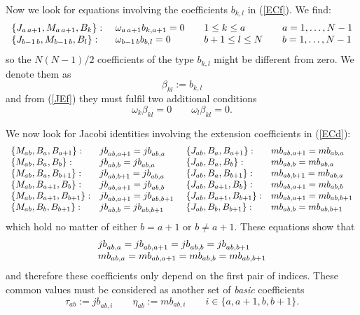 \documentclass[12pt]{article}
\begin{document}
Now we look for equations involving the  coefficients ${b}_{k,l}$
in (\ref{ECf}). We find:
\begin{equation}
\begin{array}{llll}
\{{J}_{a\, a+1},{M}_{a\, a+1},{B}_{k}\}:&\
{\omega}_{a\,a+1}{b}_{k,a+1}=0&\quad 1\le k\le a&\quad a=1,\dots,N-1\cr
\{{J}_{b-1\, b},{M}_{b-1\, b},{B}_{l}\}:&\
{\omega}_{b-1\,b}{b}_{b,l}=0&\quad b+1\le l\le N&\quad b=1,\dots,N-1
\end{array}
\label{JEf}
\end{equation}
so the $N(N-1)/2$ coefficients of the type ${b}_{k,l}$ might be
different from zero. We denote them as
\begin{equation}
{\beta}_{kl}:={b}_{k,l}
\label{cee}
\end{equation}
and from  (\ref{JEf}) they must fulfil two additional conditions
\begin{equation}
{\omega}_k {\beta}_{kl}=0\qquad {\omega}_l {\beta}_{kl}=0.
\label{cff}
\end{equation}

We now look for Jacobi identities involving the  extension
coefficients in (\ref{ECd}):
\begin{equation}
\begin{array}{llll}
\{{M}_{ab},{B}_{a},{B}_{a+1}\}:&{jb}_{ab,a+1}={jb}_{ab,a}&\
\{{J}_{ab},{B}_{a},{B}_{a+1}\}:&{mb}_{ab,a+1}={mb}_{ab,a}\cr
\{{M}_{ab},{B}_{a},{B}_{b}\}:&{jb}_{ab,b}={jb}_{ab,a}&\
\{{J}_{ab},{B}_{a},{B}_{b}\}:&{mb}_{ab,b}={mb}_{ab,a}\cr
\{{M}_{ab},{B}_{a},{B}_{b+1}\}:&{jb}_{ab,b+1}={jb}_{ab,a}&\
\{{J}_{ab},{B}_{a},{B}_{b+1}\}:&{mb}_{ab,b+1}={mb}_{ab,a}\cr
\{{M}_{ab},{B}_{a+1},{B}_{b}\}:&{jb}_{ab,a+1}={jb}_{ab,b}&\
\{{J}_{ab},{B}_{a+1},{B}_{b}\}:&{mb}_{ab,a+1}={mb}_{ab,b}\cr
\{{M}_{ab},{B}_{a+1},{B}_{b+1}\}:&{jb}_{ab,a+1}={jb}_{ab,b+1}&\
\{{J}_{ab},{B}_{a+1},{B}_{b+1}\}:&{mb}_{ab,a+1}={mb}_{ab,b+1}\cr
\{{M}_{ab},{B}_{b},{B}_{b+1}\}:&{jb}_{ab,b}={jb}_{ab,b+1}&\
\{{J}_{ab},{B}_{b},{B}_{b+1}\}:&{mb}_{ab,b}={mb}_{ab,b+1}
\end{array}
\label{cf}
\end{equation}
which hold no matter of either $b=a+1$ or $b\ne a+1$. These
equations show that
\begin{equation}
\begin{array}{l}
{jb}_{ab,a}={jb}_{ab,a+1}={jb}_{ab,b}={jb}_{ab,b+1}\cr
{mb}_{ab,a}={mb}_{ab,a+1}={mb}_{ab,b}={mb}_{ab,b+1}
\end{array}
\label{cg}
\end{equation}
and therefore these coefficients  only depend on the first pair of
indices. These common values must be considered as another set of
\emph{basic} coefficients
\begin{equation}
{\tau}_{ab}:={jb}_{ab,i}  \qquad {\eta}_{ab}:={mb}_{ab,i} \qquad
i\in\{a,a+1,b,b+1\}.
\end{equation}
\end{document}
